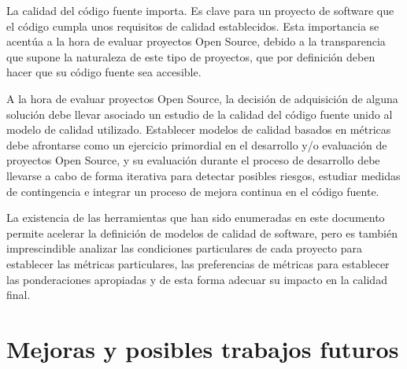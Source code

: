 \documentclass[11pt]{article}
\begin{document}
La calidad del código fuente importa. Es clave para un proyecto de software que el código cumpla unos requisitos de calidad establecidos. Esta importancia se acentúa a la hora de evaluar proyectos Open Source, debido a la transparencia que supone la naturaleza de este tipo de proyectos, que por definición deben hacer que su código fuente sea accesible.

A la hora de evaluar proyectos Open Source, la decisión de adquisición de alguna solución debe llevar asociado un estudio de la calidad del código fuente unido al modelo de calidad utilizado. Establecer modelos de calidad basados en métricas debe afrontarse como un ejercicio primordial en el desarrollo y/o evaluación de proyectos Open Source, y su evaluación durante el proceso de desarrollo debe llevarse a cabo de forma iterativa para detectar posibles riesgos, estudiar medidas de contingencia e integrar un proceso de mejora continua en el código fuente.

La existencia de las herramientas que han sido enumeradas en este documento permite acelerar la definición de modelos de calidad de software, pero es también imprescindible analizar las condiciones particulares de cada proyecto para establecer las métricas particulares, las preferencias de métricas para establecer las ponderaciones apropiadas y de esta forma adecuar su impacto en la calidad final.

\section{Mejoras y posibles trabajos futuros}
\end{document}
